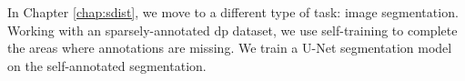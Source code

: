 In Chapter \ref{chap:sdist}, we move to a different type of task: image segmentation.
Working with an sparsely-annotated \acrlong{dp} dataset, we use self-training to
complete the areas where annotations are missing. We train a U-Net segmentation
model on the self-annotated segmentation.

